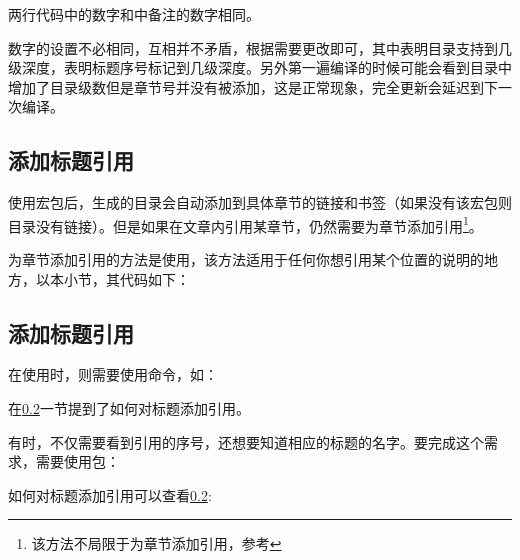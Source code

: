     \begin{texsepcode}
        \begin{texcodenoshad}
            \setcounter{tocdepth}{4}%
            \setcounter{secnumdepth}{4}%
        \end{texcodenoshad}
        \tcblower
        \begin{figure}[H]
            \centering
            \texttt{[image: \\figpath\{section-depth.pdf]}}
        \end{figure}        
    \end{texsepcode}

    两行代码中的数字和中备注的数字相同。

    数字的设置不必相同，互相并不矛盾，根据需要更改即可，其中表明目录支持到几级深度，表明标题序号标记到几级深度。另外第一遍编译的时候可能会看到目录中增加了目录级数但是章节号并没有被添加，这是正常现象，完全更新会延迟到下一次编译。

    \subsection{添加标题引用}\label{sub:ref-in-title}
    使用宏包后，生成的目录会自动添加到具体章节的链接和书签（如果没有该宏包则目录没有链接）。但是如果在文章内引用某章节，仍然需要为章节添加引用\footnote{该方法不局限于为章节添加引用，参考}。

    为章节添加引用的方法是使用，该方法适用于任何你想引用某个位置的说明的地方，以本小节，其代码如下：
    \begin{texcode}
        \subsection{添加标题引用}\label{sub:ref-in-title}
    \end{texcode}

    在使用时，则需要使用命令，如：
    \begin{texshow}
        在\ref{sub:ref-in-title}一节提到了如何对标题添加引用。
    \end{texshow}

    有时，不仅需要看到引用的序号，还想要知道相应的标题的名字。要完成这个需求，需要使用包：
    \begin{texshow}
        如何对标题添加引用可以查看\ref{sub:ref-in-title}:
    \end{texshow}

